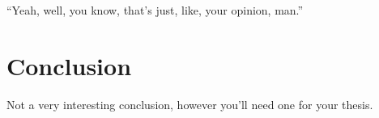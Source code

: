 \begin{savequote}[10cm] %
\sffamily
``Yeah, well, you know, that's just, like, your opinion, man.'' 
\end{savequote}

\chapter{Conclusion}

Not a very interesting conclusion, however you'll need one for your thesis.
